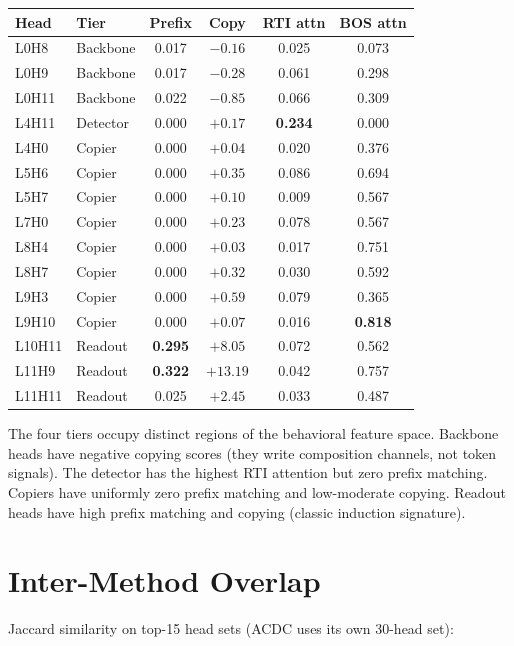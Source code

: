 \documentclass{article}
\newcommand{\NUM}[1]{\textbf{#1}}
\begin{document}
\begin{appendices}
\begin{table}[h]
\centering
\small
\begin{tabular}{llcccc}
\toprule
\textbf{Head} & \textbf{Tier} & \textbf{Prefix} & \textbf{Copy} & \textbf{RTI attn} & \textbf{BOS attn} \\
\midrule
L0H8  & Backbone & 0.017 & $-0.16$ & 0.025 & 0.073 \\
L0H9  & Backbone & 0.017 & $-0.28$ & 0.061 & 0.298 \\
L0H11 & Backbone & 0.022 & $-0.85$ & 0.066 & 0.309 \\
L4H11 & Detector & 0.000 & $+0.17$ & \NUM{0.234} & 0.000 \\
L4H0  & Copier   & 0.000 & $+0.04$ & 0.020 & 0.376 \\
L5H6  & Copier   & 0.000 & $+0.35$ & 0.086 & 0.694 \\
L5H7  & Copier   & 0.000 & $+0.10$ & 0.009 & 0.567 \\
L7H0  & Copier   & 0.000 & $+0.23$ & 0.078 & 0.567 \\
L8H4  & Copier   & 0.000 & $+0.03$ & 0.017 & 0.751 \\
L8H7  & Copier   & 0.000 & $+0.32$ & 0.030 & 0.592 \\
L9H3  & Copier   & 0.000 & $+0.59$ & 0.079 & 0.365 \\
L9H10 & Copier   & 0.000 & $+0.07$ & 0.016 & \NUM{0.818} \\
L10H11 & Readout & \NUM{0.295} & $+8.05$ & 0.072 & 0.562 \\
L11H9  & Readout & \NUM{0.322} & $+13.19$ & 0.042 & 0.757 \\
L11H11 & Readout & 0.025 & $+2.45$ & 0.033 & 0.487 \\
\bottomrule
\end{tabular}
\end{table}

The four tiers occupy distinct regions of the behavioral feature space.
Backbone heads have negative copying scores (they write composition
channels, not token signals). The detector has the highest RTI attention
but zero prefix matching. Copiers have uniformly zero prefix matching
and low-moderate copying. Readout heads have high prefix matching and
copying (classic induction signature).


\section{Inter-Method Overlap}
\label{app:overlap}

Jaccard similarity on top-15 head sets (ACDC uses its own 30-head set):


\end{appendices}
\end{document}

